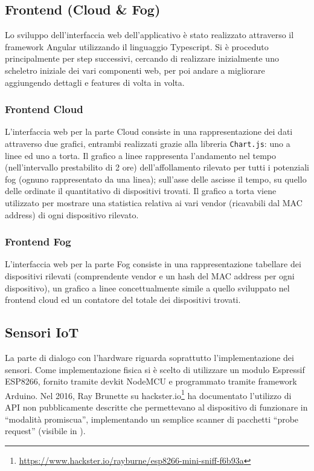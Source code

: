 \subsection{Frontend (Cloud \& Fog)}

Lo sviluppo dell'interfaccia web dell'applicativo è stato realizzato attraverso il framework Angular utilizzando il linguaggio Typescript.
Si è proceduto principalmente per step successivi, cercando di realizzare inizialmente uno scheletro iniziale dei vari componenti web, per poi andare a migliorare aggiungendo dettagli e features di volta in volta.

\subsubsection{Frontend Cloud}

L'interfaccia web per la parte Cloud consiste in una rappresentazione dei dati attraverso due grafici, entrambi realizzati grazie alla libreria \texttt{Chart.js}: uno a linee ed uno a torta.
Il grafico a linee rappresenta l'andamento nel tempo (nell'intervallo prestabilito di 2 ore) dell'affollamento rilevato per tutti i potenziali fog (ognuno rappresentato da una linea); sull'asse delle ascisse il tempo, su quello delle ordinate il quantitativo di dispositivi trovati.
Il grafico a torta viene utilizzato per mostrare una statistica relativa ai vari vendor (ricavabili dal MAC address) di ogni dispositivo rilevato.

\subsubsection{Frontend Fog}

L'interfaccia web per la parte Fog consiste in una rappresentazione tabellare dei dispositivi rilevati (comprendente vendor e un hash del MAC address per ogni dispositivo), un grafico a linee concettualmente simile a quello sviluppato nel frontend cloud ed un contatore del totale dei dispositivi trovati.

\subsection{Sensori IoT}

La parte di dialogo con l'hardware riguarda soprattutto l'implementazione dei sensori.
Come implementazione fisica si è scelto di utilizzare un modulo Espressif ESP8266, fornito tramite devkit NodeMCU e programmato tramite framework Arduino.
Nel 2016, Ray Brunette su hackster.io\footnote{\url{https://www.hackster.io/rayburne/esp8266-mini-sniff-f6b93a}} ha documentato l'utilizzo di API non pubblicamente descritte che permettevano al dispositivo di funzionare in ``modalità promiscua'',
implementando un semplice scanner di pacchetti ``probe request'' (visibile in ).

